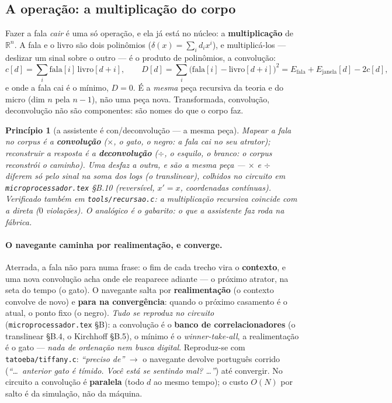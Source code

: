 \documentclass[11pt]{article}
\newcommand{\code}[1]{\texttt{\small #1}}
\newcommand{\R}{\mathbb R}
\theoremstyle{plain}
\newtheorem{principio}{Princípio}
\theoremstyle{remark}
\begin{document}
\subsection{A operação: a multiplicação do corpo}

Fazer a fala \emph{cair} é uma só operação, e ela já está no núcleo: a \textbf{multiplicação} de
$\R^n$. A fala e o livro são dois polinômios ($\delta(x)=\sum_i d_i x^i$), e multiplicá-los ---
deslizar um sinal sobre o outro --- é o produto de polinômios, a convolução:
\[
 c[d]=\sum_i \text{fala}[i]\,\text{livro}[d+i],\qquad
 D[d]=\sum_i\big(\text{fala}[i]-\text{livro}[d+i]\big)^2=E_{\text{fala}}+E_{\text{janela}}[d]-2c[d],
\]
e onde a fala cai é o mínimo, $D=0$. É a \emph{mesma} peça recursiva da teoria e do micro (dim $n$
pela $n-1$), não uma peça nova. Transformada, convolução, deconvolução não são componentes: são
nomes do que o corpo faz.

\begin{principio}[a assistente é con/deconvolução --- a mesma peça]
Mapear a fala no corpus é a \textbf{convolução} ($\times$, o gato, o negro: a fala cai no seu
atrator); reconstruir a resposta é a \textbf{deconvolução} ($\div$, o esquilo, o branco: o corpus
reconstrói o caminho). Uma desfaz a outra, e são a \emph{mesma} peça --- $\times$ e $\div$ diferem só
pelo sinal na soma dos logs (o translinear), colhidos no circuito em \code{microprocessador.tex}
§B.10 (reversível, $x'=x$, coordenadas contínuas). Verificado também em \code{tools/recursao.c}: a
multiplicação recursiva coincide com a direta ($0$ violações). O analógico é o gabarito: o que a
assistente faz roda na fábrica.
\end{principio}

\paragraph{O navegante caminha por realimentação, e converge.} Aterrada, a fala não para numa frase:
o fim de cada trecho vira o \textbf{contexto}, e uma nova convolução acha onde ele reaparece adiante
--- o próximo atrator, na seta do tempo (o gato). O navegante salta por \textbf{realimentação} (o
contexto convolve de novo) e \textbf{para na convergência}: quando o próximo casamento é o atual, o
ponto fixo (o negro). \emph{Tudo se reproduz no circuito} (\code{microprocessador.tex} §B): a
convolução é o \textbf{banco de correlacionadores} (o translinear §B.4, o Kirchhoff §B.5), o mínimo é
o \emph{winner-take-all}, a realimentação é o gato --- \emph{nada de ordenação nem busca digital}.
Reproduz-se com \code{tatoeba/tiffany.c}: \emph{``preciso de''} $\to$ o navegante devolve
português corrido (\emph{``\dots\ anterior gato é tímido. Você está se sentindo mal? \dots''}) até
convergir. No circuito a convolução é \textbf{paralela} (todo $d$ ao mesmo tempo); o custo $O(N)$ por
salto é da simulação, não da máquina.
\end{document}
